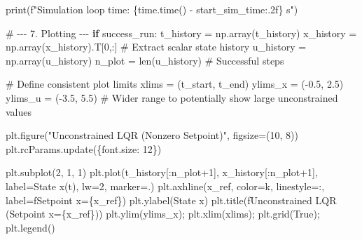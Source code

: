 \documentclass[
  letterpaper,
  DIV=11,
  numbers=noendperiod,
  oneside]{scrartcl}
\newenvironment{Shaded}{\begin{snugshade}}{\end{snugshade}}
\newcommand{\BuiltInTok}[1]{\textcolor[rgb]{0.00,0.23,0.31}{#1}}
\newcommand{\CommentTok}[1]{\textcolor[rgb]{0.37,0.37,0.37}{#1}}
\newcommand{\ControlFlowTok}[1]{\textcolor[rgb]{0.00,0.23,0.31}{\textbf{#1}}}
\newcommand{\DecValTok}[1]{\textcolor[rgb]{0.68,0.00,0.00}{#1}}
\newcommand{\FloatTok}[1]{\textcolor[rgb]{0.68,0.00,0.00}{#1}}
\newcommand{\NormalTok}[1]{\textcolor[rgb]{0.00,0.23,0.31}{#1}}
\newcommand{\OperatorTok}[1]{\textcolor[rgb]{0.37,0.37,0.37}{#1}}
\newcommand{\SpecialCharTok}[1]{\textcolor[rgb]{0.37,0.37,0.37}{#1}}
\newcommand{\SpecialStringTok}[1]{\textcolor[rgb]{0.13,0.47,0.30}{#1}}
\newcommand{\StringTok}[1]{\textcolor[rgb]{0.13,0.47,0.30}{#1}}
\newcommand{\VariableTok}[1]{\textcolor[rgb]{0.07,0.07,0.07}{#1}}
\begin{document}
\begin{Shaded}
\begin{Highlighting}[]
\BuiltInTok{print}\NormalTok{(}\SpecialStringTok{f"Simulation loop time: }\SpecialCharTok{\{}\NormalTok{time}\SpecialCharTok{.}\NormalTok{time() }\OperatorTok{{-}}\NormalTok{ start\_sim\_time}\SpecialCharTok{:.2f\}}\SpecialStringTok{ s"}\NormalTok{)}

\CommentTok{\# {-}{-}{-} 7. Plotting {-}{-}{-}}
\ControlFlowTok{if}\NormalTok{ success\_run:}
\NormalTok{    t\_history }\OperatorTok{=}\NormalTok{ np.array(t\_history)}
\NormalTok{    x\_history }\OperatorTok{=}\NormalTok{ np.array(x\_history).T[}\DecValTok{0}\NormalTok{,:] }\CommentTok{\# Extract scalar state history}
\NormalTok{    u\_history }\OperatorTok{=}\NormalTok{ np.array(u\_history)}
\NormalTok{    n\_plot }\OperatorTok{=} \BuiltInTok{len}\NormalTok{(u\_history) }\CommentTok{\# Successful steps}

    \CommentTok{\# Define consistent plot limits}
\NormalTok{    xlims }\OperatorTok{=}\NormalTok{ (t\_start, t\_end)}
\NormalTok{    ylims\_x }\OperatorTok{=}\NormalTok{ (}\OperatorTok{{-}}\FloatTok{0.5}\NormalTok{, }\FloatTok{2.5}\NormalTok{)}
\NormalTok{    ylims\_u }\OperatorTok{=}\NormalTok{ (}\OperatorTok{{-}}\FloatTok{3.5}\NormalTok{, }\FloatTok{5.5}\NormalTok{) }\CommentTok{\# Wider range to potentially show large unconstrained values}

\NormalTok{    plt.figure(}\StringTok{"Unconstrained LQR (Nonzero Setpoint)"}\NormalTok{, figsize}\OperatorTok{=}\NormalTok{(}\DecValTok{10}\NormalTok{, }\DecValTok{8}\NormalTok{))}
\NormalTok{    plt.rcParams.update(\{}\StringTok{\textquotesingle{}font.size\textquotesingle{}}\NormalTok{: }\DecValTok{12}\NormalTok{\})}

\NormalTok{    plt.subplot(}\DecValTok{2}\NormalTok{, }\DecValTok{1}\NormalTok{, }\DecValTok{1}\NormalTok{)}
\NormalTok{    plt.plot(t\_history[:n\_plot}\OperatorTok{+}\DecValTok{1}\NormalTok{], x\_history[:n\_plot}\OperatorTok{+}\DecValTok{1}\NormalTok{], label}\OperatorTok{=}\StringTok{\textquotesingle{}State x(t)\textquotesingle{}}\NormalTok{, lw}\OperatorTok{=}\DecValTok{2}\NormalTok{, marker}\OperatorTok{=}\StringTok{\textquotesingle{}.\textquotesingle{}}\NormalTok{)}
\NormalTok{    plt.axhline(x\_ref, color}\OperatorTok{=}\StringTok{\textquotesingle{}k\textquotesingle{}}\NormalTok{, linestyle}\OperatorTok{=}\StringTok{\textquotesingle{}:\textquotesingle{}}\NormalTok{, label}\OperatorTok{=}\SpecialStringTok{f\textquotesingle{}Setpoint x=}\SpecialCharTok{\{}\NormalTok{x\_ref}\SpecialCharTok{\}}\SpecialStringTok{\textquotesingle{}}\NormalTok{)}
\NormalTok{    plt.ylabel(}\StringTok{\textquotesingle{}State x\textquotesingle{}}\NormalTok{)}
\NormalTok{    plt.title(}\SpecialStringTok{f\textquotesingle{}Unconstrained LQR (Setpoint x=}\SpecialCharTok{\{}\NormalTok{x\_ref}\SpecialCharTok{\}}\SpecialStringTok{)\textquotesingle{}}\NormalTok{)}
\NormalTok{    plt.ylim(ylims\_x)}\OperatorTok{;}\NormalTok{ plt.xlim(xlims)}\OperatorTok{;}\NormalTok{ plt.grid(}\VariableTok{True}\NormalTok{)}\OperatorTok{;}\NormalTok{ plt.legend()}


\end{Highlighting}
\end{Shaded}
\end{document}
